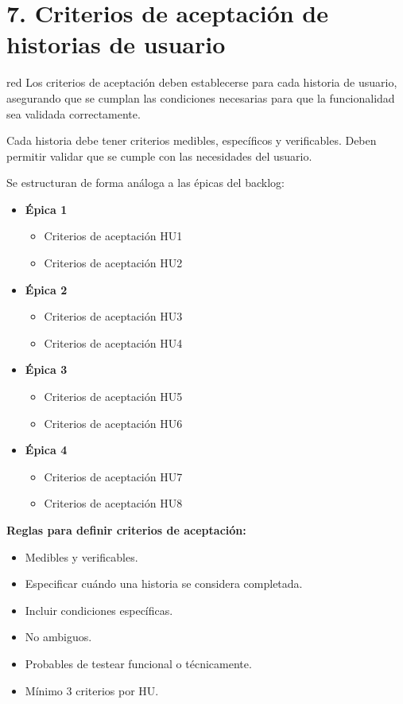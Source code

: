 \section{7. Criterios de aceptación de historias de usuario}
\label{sec:criteriosAceptacion}


\begin{consigna}{red}
Los criterios de aceptación deben establecerse para cada historia de usuario, asegurando que se cumplan las condiciones necesarias para que la funcionalidad sea validada correctamente.

Cada historia debe tener criterios medibles, específicos y verificables. Deben permitir validar que se cumple con las necesidades del usuario.

Se estructuran de forma análoga a las \'{e}picas del backlog:

\begin{itemize}
  \item \textbf{\'{E}pica 1}
    \begin{itemize}
      \item Criterios de aceptación HU1
      \item Criterios de aceptación HU2
    \end{itemize}
  \item \textbf{\'{E}pica 2}
    \begin{itemize}
      \item Criterios de aceptación HU3
      \item Criterios de aceptación HU4
    \end{itemize}
  \item \textbf{\'{E}pica 3}
    \begin{itemize}
      \item Criterios de aceptación HU5
      \item Criterios de aceptación HU6
    \end{itemize}
  \item \textbf{\'{E}pica 4}
    \begin{itemize}
      \item Criterios de aceptación HU7
      \item Criterios de aceptación HU8
    \end{itemize}
\end{itemize}

\textbf{Reglas para definir criterios de aceptación:}
\begin{itemize}
  \item Medibles y verificables.
  \item Especificar cuándo una historia se considera completada.
  \item Incluir condiciones específicas.
  \item No ambiguos.
  \item Probables de testear funcional o técnicamente.
  \item Mínimo 3 criterios por HU.
\end{itemize}
\end{consigna}

